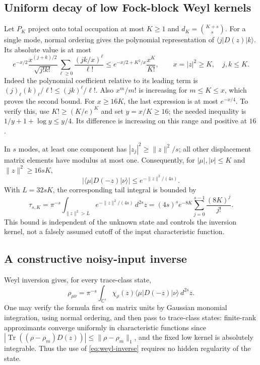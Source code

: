 \subsection{Uniform decay of low Fock-block Weyl kernels}
Let $P_K$ project onto total occupation at most $K\ge1$ and
$d_K=\binom{K+s}{s}$. For a single mode, normal ordering gives the polynomial
representation of $\langle j|D(z)|k\rangle$. Its absolute value is at most
\[
 e^{-x/2}\frac{x^{(j+k)/2}}{\sqrt{j!k!}}
       \sum_{\ell\ge0}\frac{(jk/x)^\ell}{\ell!}
 \le e^{-x/2+K^2/x}\frac{x^K}{K!},\qquad
 x=|z|^2\ge K,\quad j,k\le K.
 \tag{D.4}\label{eq:weyl-low-kernel}
\]
Indeed the polynomial coefficient relative to its leading term is
$(j)_\ell(k)_\ell/\ell!\le(jk)^\ell/\ell!$. Also $x^m/m!$ is increasing
for $m\le K\le x$, which proves the second bound.
For $x\ge16K$, the last expression is at most $e^{-x/4}$.
To verify this, use $K!\ge(K/e)^K$ and set $y=x/K\ge16$; the needed
inequality is $1/y+1+\log y\le y/4$. Its difference is increasing on this
range and positive at $16$.

In $s$ modes, at least one component has $|z_j|^2\ge\|z\|^2/s$; all other
displacement matrix elements have modulus at most one. Consequently, for
$|\mu|,|\nu|\le K$ and $\|z\|^2\ge16sK$,
\[
 |\langle\mu|D(-z)|\nu\rangle|\le e^{-\|z\|^2/(4s)}.
 \tag{D.5}\label{eq:weyl-tail}
\]
With $L=32sK$, the corresponding tail integral is bounded by
\[
 \tau_{s,K}=\pi^{-s}\int_{\|z\|^2>L}e^{-\|z\|^2/(4s)}\,d^{2s}z
 =(4s)^s e^{-8K}\sum_{j=0}^{s-1}\frac{(8K)^j}{j!}.
 \tag{D.6}\label{eq:weyl-tail-integral}
\]
This bound is independent of the unknown state and controls the inversion
kernel, not a falsely assumed cutoff of the input characteristic function.

\subsection{A constructive noisy-input inverse}
Weyl inversion gives, for every trace-class state,
\[
 \rho_{\mu\nu}=\pi^{-s}\int_{\mathbb C^s}
       \chi_\rho(z)\langle\mu|D(-z)|\nu\rangle\,d^{2s}z.
 \tag{D.7}\label{eq:weyl-inverse}
\]
One may verify the formula first on matrix units by Gaussian monomial
integration, using normal ordering, and then pass to trace-class states:
finite-rank approximants converge uniformly in characteristic functions
since $|\operatorname{Tr}((\rho-\rho_m)D(z))|\le\|\rho-\rho_m\|_1$,
and the fixed low kernel is absolutely integrable. Thus the use of
\eqref{eq:weyl-inverse} requires no hidden regularity of the state.

